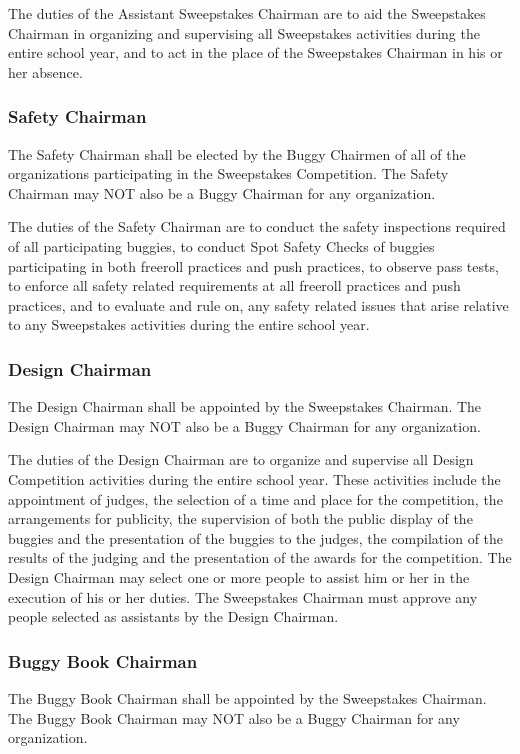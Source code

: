 \documentclass[openany]{book}
\begin{document}
The duties of the Assistant Sweepstakes Chairman are to aid the Sweepstakes Chairman in organizing and supervising all Sweepstakes activities during the entire school year, and to act in the place of the Sweepstakes Chairman in his or her absence.

\subsubsection{Safety Chairman}
The Safety Chairman shall be elected by the Buggy Chairmen of all of the organizations participating in the Sweepstakes Competition. The Safety Chairman may NOT also be a Buggy Chairman for any organization.

The duties of the Safety Chairman are to conduct the safety inspections required of all participating buggies, to conduct Spot Safety Checks of buggies participating in both freeroll practices and push practices, to observe pass tests, to enforce all safety related requirements at all freeroll practices and push practices, and to evaluate and rule on, any safety related issues that arise relative to any Sweepstakes activities during the entire school year.

\subsubsection{Design Chairman}
The Design Chairman shall be appointed by the Sweepstakes Chairman. The Design Chairman may NOT also be a Buggy Chairman for any organization.

The duties of the Design Chairman are to organize and supervise all Design Competition activities during the entire school year. These activities include the appointment of judges, the selection of a time and place for the competition, the arrangements for publicity, the supervision of both the public display of the buggies and the presentation of the buggies to the judges, the compilation of the results of the judging and the presentation of the awards for the competition. The Design Chairman may select one or more people to assist him or her in the execution of his or her duties. The Sweepstakes Chairman must approve any people selected as assistants by the Design Chairman.

\subsubsection{Buggy Book Chairman}
The Buggy Book Chairman shall be appointed by the Sweepstakes Chairman. The Buggy Book Chairman may NOT also be a Buggy Chairman for any organization.
\end{document}
